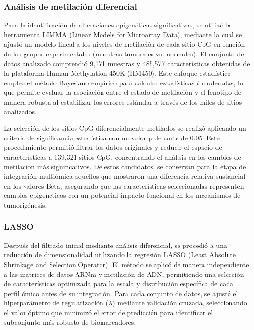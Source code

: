 \documentclass[preprint,number]{elsarticle}
\begin{document}
\subsubsection{Análisis de metilación diferencial}

Para la identificación de alteraciones epigenéticas significativas, se utilizó la herramienta LIMMA (Linear Models for Microarray Data), mediante la cual se ajustó un modelo lineal a los niveles de metilación de cada sitio CpG en función de los grupos experimentales (muestras tumorales vs. normales). El conjunto de datos analizado comprendió 9,171 muestras y 485,577 características obtenidas de la plataforma Human Methylation 450K (HM450). Este enfoque estadístico emplea el método Bayesiano empírico para calcular estadísticas $t$ moderadas, lo que permite evaluar la asociación entre el estado de metilación y el fenotipo de manera robusta al estabilizar los errores estándar a través de los miles de sitios analizados.

La selección de los sitios CpG diferencialmente metilados se realizó aplicando un criterio de significancia estadística con un valor p de corte de 0.05. Este procedimiento permitió filtrar los datos originales y reducir el espacio de características a 139,321 sitios CpG, concentrando el análisis en los cambios de metilación más significativos. De estos candidatos, se conservan para la etapa de integración multiómica aquellos que mostraron una diferencia relativa sustancial en los valores Beta, asegurando que las características seleccionadas representen cambios epigenéticos con un potencial impacto funcional en los mecanismos de tumorigénesis.


\subsubsection{LASSO}

Después del filtrado inicial mediante análisis diferencial, se procedió a una reducción de dimensionalidad utilizando la regresión LASSO (Least Absolute Shrinkage and Selection Operator). El método se aplicó de manera independiente a las matrices de datos ARNm y metilación de ADN, permitiendo una selección de características optimizada para la escala y distribución específica de cada perfil ómico antes de su integración. Para cada conjunto de datos, se ajustó el hiperparámetro de regularización ($\lambda$) mediante validación cruzada, seleccionando el valor óptimo que minimizó el error de predicción para identificar el subconjunto más robusto de biomarcadores.
\end{document}
